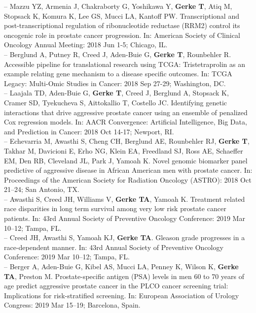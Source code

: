 \documentclass[11pt, a4paper]{article} %
\begin{document}
-- Mazzu YZ, Armenia J, Chakraborty G, Yoshikawa Y, {\bf Gerke T}, Atiq M, Stopsack K, Komura K, Lee GS, Mucci LA, Kantoff PW. Transcriptional and post-transcriptional regulation of ribonucleotide reductase (RRM2) control its oncogenic role in prostate cancer progression. In: American Society of Clinical Oncology Annual Meeting: 2018 Jun 1-5; Chicago, IL.\\

-- Berglund A, Putney R, Creed J, Aden-Buie G, {\bf Gerke T}, Rounbehler R. Accessible pipeline for translational research using TCGA: Tristetraprolin as an example relating gene mechanism to a disease specific outcomes. In: TCGA Legacy: Multi-Omic Studies in Cancer: 2018 Sep 27-29; Washington, DC.\\

-- Laajala TD, Aden-Buie G, {\bf Gerke T}, Creed J, Berglund A, Stopsack K, Cramer SD, Tyekucheva S, Aittokallio T, Costello JC. Identifying genetic interactions that drive aggressive prostate cancer using an ensemble of penalized Cox regression models.  In: AACR Convergence: Artificial Intelligence, Big Data, and Prediction in Cancer: 2018 Oct 14-17; Newport, RI.\\

-- Echevarria M, Awasthi S, Cheng CH, Berglund AE, Rounbehler RJ, {\bf Gerke T}, Takhar M, Davicioni E, Erho NG, Klein EA, Freedland SJ, Ross AE, Schaeffer EM, Den RB, Cleveland JL, Park J, Yamoah K. Novel genomic biomarker panel predictive of aggressive disease in African American men with prostate cancer. In: Proceedings of the American Society for Radiation Oncology (ASTRO): 2018 Oct 21--24; San Antonio, TX.\\

-- Awasthi S, Creed JH, Williams V, {\bf Gerke TA}, Yamoah K. Treatment related race disparities in long term survival among very low risk prostate cancer patients. In: 43rd Annual Society of Preventive Oncology Conference: 2019 Mar 10--12; Tampa, FL. \\

-- Creed JH, Awasthi S, Yamoah KJ, {\bf Gerke TA}. Gleason grade progresses in a race-dependent manner. In: 43rd Annual Society of Preventive Oncology Conference: 2019 Mar 10--12; Tampa, FL.\\

-- Berger A, Aden-Buie G, Kibel AS, Mucci LA, Penney K, Wilson K, {\bf Gerke TA}, Preston M. Prostate-specific antigen (PSA) levels in men 60 to 70 years of age predict aggressive prostate cancer in the PLCO cancer screening trial: Implications for risk-stratified screening. In: European Association of Urology Congress: 2019 Mar 15--19; Barcelona, Spain.\\
\end{document}
